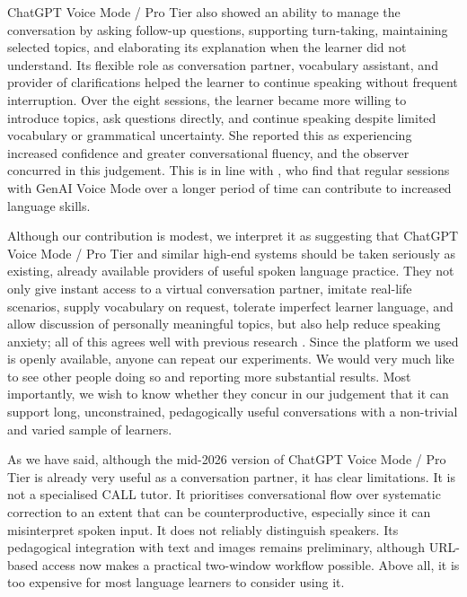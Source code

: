 \documentclass[11pt,a4paper]{article}
\begin{document}
ChatGPT Voice Mode / Pro Tier also showed an ability to manage the conversation by asking follow-up questions, supporting turn-taking, maintaining selected topics, and elaborating its explanation when the learner did not understand. Its flexible role as conversation partner, vocabulary assistant, and provider of clarifications helped the learner to continue speaking without frequent interruption. Over the eight sessions, the learner became more willing to introduce topics, ask questions directly, and continue speaking despite limited vocabulary or grammatical uncertainty. She reported this as experiencing increased confidence and greater conversational fluency, and the observer concurred in this judgement. This is in line with \citet{CarreraNunezEtAl2025}, who find that regular sessions with GenAI Voice Mode over a longer period of time can contribute to increased language skills.

Although our contribution is modest, we interpret it as suggesting that ChatGPT Voice Mode / Pro Tier and similar high-end systems should be taken seriously as existing, already available providers of useful spoken language practice. They not only give instant access to a virtual conversation partner, imitate real-life scenarios, supply vocabulary on request, tolerate imperfect learner language, and allow discussion of personally meaningful topics, but also help reduce speaking anxiety; all of this agrees well with previous research \citep{DuDaniel2024,MengZou2026,SaarelaEtAl2026}. Since the platform we used is openly available, anyone can repeat our experiments. We would very much like to see other people doing so and reporting more substantial results. Most importantly, we wish to know whether they concur in our judgement that it can support long, unconstrained, pedagogically useful conversations with a non-trivial and varied sample of learners.

As we have said, although the mid-2026 version of ChatGPT Voice Mode / Pro Tier is already very useful as a conversation partner, it has clear limitations. It is not a specialised CALL tutor. It prioritises conversational flow over systematic correction to an extent that can be counterproductive, especially since it can misinterpret spoken input. It does not reliably distinguish speakers. Its pedagogical integration with text and images remains preliminary, although URL-based access now makes a practical two-window workflow possible. Above all, it is too expensive for most language learners to consider using it.
\end{document}
